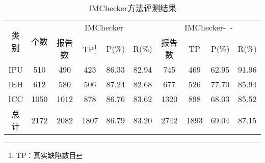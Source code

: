 \begin{table}[b]
	\centering
	\begin{minipage}[t]{0.95\linewidth} %
		\caption{IMChecker方法评测结果}
		\label{tab:3-4-imchecker}
		\begin{tabular}{@{\extracolsep{4pt}}cccccccccc@{}}
			\hline
			\multirow{2}{*}{类别 } & \multirow{2}{*}{个数} & \multicolumn{4}{c}{IMChecker} & \multicolumn{4}{c}{IMChecker-~-} \\
			\cline{3-6} \cline{7-10}
			 & & 报告数 & TP\footnote{TP：真实缺陷数目} & P(\%) & R(\%) & 报告数 & TP& P(\%) & R(\%) \\
			 \hline
			 IPU & 510 & 490 & 423 & 86.33 & 82.94 & 745 & 469 & 62.95 & 91.96 \\
			 IEH & 612 & 580 & 506 & 87.24 & 82.68 & 677 & 526 & 77.70 & 85.94 \\
			 ICC & 1050 & 1012 & 878 & 86.76 & 83.62 & 1320 & 898 & 68.03 & 85.52 \\
			 总计 & 2172 &  2082 & 1807 & 86.79 & 83.20 & 2742 & 1893 & 69.04 & 87.15 \\
			\hline
		\end{tabular}
	\end{minipage}
\end{table}